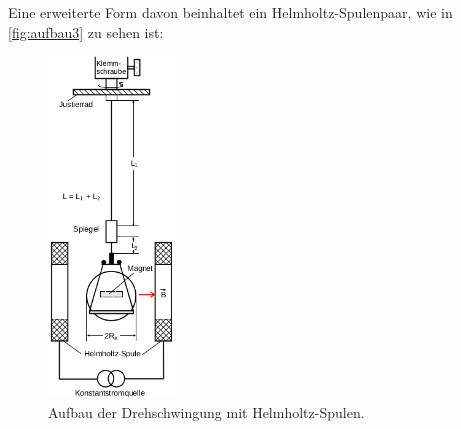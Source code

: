 Eine erweiterte Form davon beinhaltet ein Helmholtz-Spulenpaar, wie in \autoref{fig:aufbau3} zu sehen ist:
\begin{figure}
    \centering
    \includegraphics[width=0.3\textwidth]{content/Bilder/Magnet.png}
    \caption{Aufbau der Drehschwingung mit Helmholtz-Spulen.}
    \label{fig:aufbau3}
\end{figure}